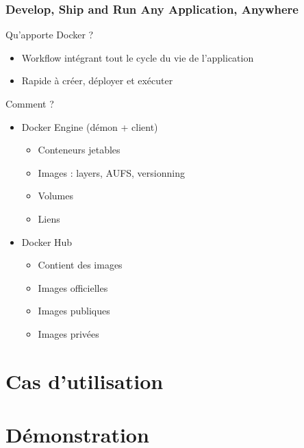 \documentclass[10pt, compress]{beamer}
\begin{document}
\begin{frame}[fragile]
  \frametitle{Develop, Ship and Run Any Application, Anywhere}
  Qu'apporte Docker ?
  \pause
  \begin{itemize}[<+- | alert@+>]
  \item Workflow intégrant tout le cycle du vie de l'application
  \item Rapide à créer, déployer et exécuter
  \end{itemize}
  \pause
   Comment ?
   \pause
  
\begin{itemize}[<+- | alert@+>]
  \item Docker Engine (démon + client)
    \begin{itemize}[<+- | alert@+>]
      \item Conteneurs jetables
      \item Images : layers, AUFS, versionning
      \item Volumes
      \item Liens
    \end{itemize}
  \item Docker Hub
  \begin{itemize}[<+- | alert@+>]
      \item Contient des images
      \item Images officielles
      \item Images publiques
      \item Images privées
    \end{itemize}

\end{itemize}
\end{frame}

\section{Cas d'utilisation}

\section{Démonstration}

\end{document}
